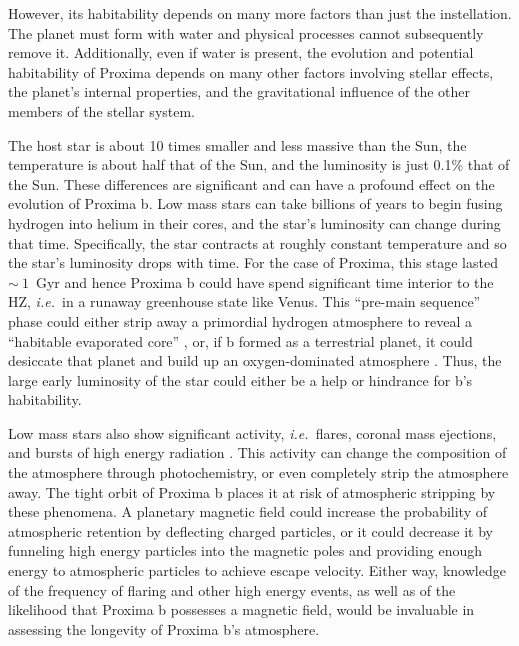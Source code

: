 \documentclass[preprint,12pt]{aastex}
\newcommand{\xxx}[1]{{\color{red} #1}} %
\newcommand{\xxx}[1]{{\color{red} #1}} %
\def\eg{{\it e.g.\ }}
\def\ie{{\it i.e.\ }}
\begin{document}
However, its habitability depends on many more factors than just the
instellation. The planet must form with water and physical processes
cannot subsequently remove it. Additionally, even if water is present,
the evolution \xxx{and potential habitability} of Proxima depends on many other factors involving
stellar effects, the planet's internal properties, and the
gravitational influence of the other members of the stellar system.

The host star is about 10 times smaller and less massive than the Sun,
the temperature is about half that of the Sun, and the luminosity is
just 0.1\% that of the Sun. These differences are significant and can
have a profound effect on the evolution of Proxima b. Low mass stars
can take billions of years to begin fusing hydrogen into helium in
their cores, and the star's luminosity can change during that
time. Specifically, the star contracts at roughly constant temperature and so
the star's luminosity drops with time. For the case of Proxima, this
stage lasted $\sim~1$~Gyr \citep{Baraffe15} and hence Proxima b
could have spend significant time interior to the HZ, \ie in a runaway
greenhouse state like Venus. This ``pre-main sequence'' phase could
either strip away a primordial hydrogen atmosphere to reveal a
``habitable evaporated core'' \citep{Luger15}, or, if b formed as a
terrestrial planet, it could desiccate that planet and build up an
oxygen-dominated atmosphere \citep{LugerBarnes15}. Thus, the large
early luminosity of the star could either be a help or hindrance for
b's habitability.

Low mass stars also show significant activity, \ie flares, coronal
mass ejections, and bursts of high energy radiation
\citep[\eg][]{West08}. This activity can change the composition of the
atmosphere through photochemistry, or even completely strip the
atmosphere away. The tight orbit of Proxima b places it at risk of
atmospheric stripping by these phenomena. A planetary magnetic field
could increase the probability of atmospheric retention by deflecting
charged particles, or it could decrease it by funneling high energy
particles into the magnetic poles and providing enough energy to
atmospheric particles to achieve escape velocity. Either way, knowledge of the
frequency of flaring and other high energy events, as well as of the
likelihood that Proxima b possesses a magnetic field, would be
invaluable in assessing the longevity of Proxima b's atmosphere.
\end{document}
